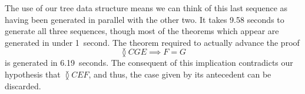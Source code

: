 \linebreak

The use of our tree data structure means we can think of this last sequence as having been generated in parallel with the other two. It takes 9.58 seconds to generate all three sequences, though most of the theorems which appear are generated in under 1~second. The theorem required to actually advance the proof
\begin{displaymath}
\between{C}{G}{E} \implies F = G
\end{displaymath}
is generated in 6.19~seconds. The consequent of this implication contradicts our hypothesis that $\between{C}{E}{F}$, and thus, the case given by its antecedent can be discarded.

